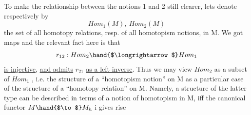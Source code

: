 To make the relationship between the notions 1\hand{)} and 2\hand{)} still clearer,
lets denote respectively by
\[ Hom_1(M),\ Hom_2(M) \]
the set of all homotopy  relations,  resp. of all homotopism
notions,  in M.  We got maps\hand{*}
and the relevant fact here is that
\[ r_{12}: Hom_2 \hand{$\longrightarrow$} Hom_1 \]
\uline{is injective},  \uline{and admits} $r_{21}$ \uline{as a left inverse}.  Thus we may view
$Hom_2$ as a subset of $Hom_1$ ,  i.e. the structure of a ``homotopism notion'' on
M as a particular case of the structure of a ``homotopy relation'' on M.
Namely,  a structure of the latter type can be described in terms of a
notion of homotopism in M,  iff the canonical functor $M \hand{$\to$} M_h$ i gives rise


